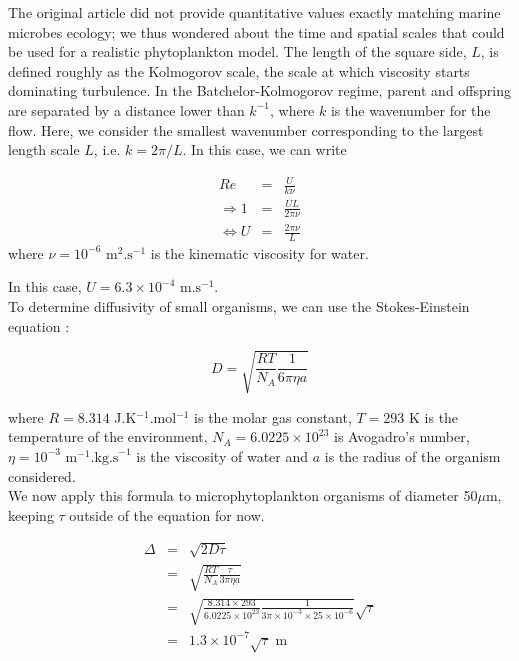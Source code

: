 The original article did not provide quantitative values exactly matching marine microbes ecology; we thus wondered about the time and spatial scales that could be used for a realistic phytoplankton model. The length of the square side, $L$, is defined roughly as the Kolmogorov scale, the scale at which viscosity starts dominating turbulence. In the Batchelor-Kolmogorov regime, parent and offspring are separated by a distance lower than $k^{-1}$, where $k$ is the wavenumber for the flow. Here, we consider the smallest wavenumber corresponding to the largest length scale $L$, i.e. $k=2\pi/L$. In this case, we can write
 
\begin{eqnarray}
 Re & = &\frac{U}{k\nu}\\
\Rightarrow 1 & = & \frac{UL}{2\pi\nu}\\
\Leftrightarrow U & = &\frac{2\pi\nu}{L}
\end{eqnarray}
% 
where $\nu=10^{-6} \text{ m}^{2}.\text{s}^{-1}$ is the kinematic viscosity for water.

In this case, $U=6.3\times10^{-4} \text{ m.s}^{-1}$.\\

To determine diffusivity of small organisms, we can use the Stokes-Einstein equation \citep{einstein1905molekularkinetischen}:

\begin{equation}
 D=\sqrt{\frac{RT}{N_{A}}\frac{1}{6\pi\eta a}}
\end{equation}

where $R=8.314$ J.K$^{-1}$.mol$^{-1}$ is the molar gas constant, $T=293$ K is the temperature of the environment, $N_{A}=6.0225\times10^{23}$ is Avogadro's number, $\eta=10^{-3}\text{ m}^{-1}.\text{kg.s}^{-1}$ is the viscosity of water and $a$ is the radius of the organism considered.\\

We now apply this formula to microphytoplankton organisms of diameter 50$\mu$m, keeping $\tau$ outside of the equation for now.

\begin{eqnarray}
\Delta & = & \sqrt{2D\tau}\\
  &= & \sqrt{\frac{RT}{N_{A}}\frac{\tau}{3\pi\eta a}}\\
&=& \sqrt{\frac{8.314\times293}{6.0225\times10^{23}}\frac{1}{3\pi\times10^{-3}\times25\times10^{-6}}}\sqrt{\tau}\\
 & = & 1.3 \times 10^{-7} \sqrt{\tau} \text{ m}
\end{eqnarray}

